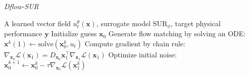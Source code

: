 \begin{algorithm}[H]
    \caption{\textit{Dflow-SUR}}
    \begin{algorithmic}
    \Require A learned vector field $u_{t}^{\theta}(\mathbf{x})$, surrogate model $\mathrm{SUR}_{\phi}$, target physical performance $\mathbf{y}$
    \State Initialize guess $\mathbf{x}_0$
        \State Generate flow matching by solving an ODE: $\mathbf{x}^{k}(1) \leftarrow \text{solve}(\mathbf{x}_0^{k}, u_t)$
        \State Compute gradient by chain rule: $\nabla_{\mathbf{x}_0} \mathcal{L}(\mathbf{x}_1) = D_{\mathbf{x}_0} \mathbf{x}_1^\top \nabla_{\mathbf{x}_1} \mathcal{L}(\mathbf{x}_1)$
        \State Optimize initial noise: $\mathbf{x}_0^{k+1} \leftarrow \mathbf{x}_0^{k} - \tau \nabla_{\mathbf{x}_0} \mathcal{L}(\mathbf{x}^{k}_1)$
    \EndFor
    \end{algorithmic}
    \label{ch7:alg:dflowSUR}
\end{algorithm}



